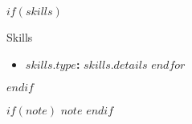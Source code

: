 \documentclass{mcdowellcv}
\begin{document}
  $if(skills)$
  \begin{cvsection}{Skills}
    \begin{cvsubsection}{}{}{}
      \begin{itemize}
        $for(skills)$
        \item \textbf{$skills.type$: }$skills.details$
        $endfor$
      \end{itemize}
    \end{cvsubsection}
  \end{cvsection}
  $endif$
  
  $if(note)$
  \textbf{\footnotesize $note$}
  $endif$
\end{document}
